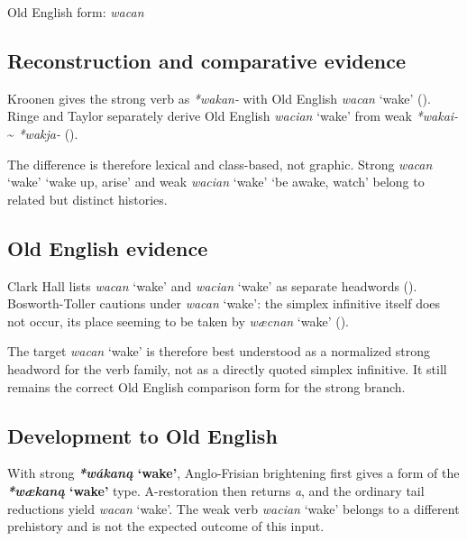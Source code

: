 \documentclass[
  british,
  a4paper,
  openany]{book}
\providecommand{\Recon}[1]{\emph{*#1}}
{\catcode`→=\active \global\def→{\ensuremath{\rightarrow}}}
\providecommand{\Recon}[1]{\emph{*#1}}
{\catcode`→=\active \global\def→{\ensuremath{\rightarrow}}}
\begin{document}
Old English form: \emph{wacan}

\subsection{Reconstruction and comparative
evidence}\label{reconstruction-and-comparative-evidence-101}

Kroonen gives the strong verb as \emph{*wakan-} with Old English
{\emph{wacan}} `wake' ().
Ringe and Taylor separately derive Old English {\emph{wacian}} `wake'
from weak \emph{*wakai-} \textasciitilde{} \emph{*wakja-}
().

The difference is therefore lexical and class-based, not graphic. Strong
{\emph{wacan}} `wake' `wake up, arise' and weak {\emph{wacian}} `wake'
`be awake, watch' belong to related but distinct histories.

\subsection{Old English evidence}\label{old-english-evidence-101}

Clark Hall lists {\emph{wacan}} `wake' and {\emph{wacian}} `wake' as
separate headwords ().
Bosworth-Toller cautions under {\emph{wacan}} `wake': the simplex
infinitive itself does not occur, its place seeming to be taken by
{\emph{wæcnan}} `wake' ().

The target {\emph{wacan}} `wake' is therefore best understood as a
normalized strong headword for the verb family, not as a directly quoted
simplex infinitive. It still remains the correct Old English comparison
form for the strong branch.

\subsection{Development to Old
English}\label{development-to-old-english-101}

With strong \textbf{{\Recon{wákaną} `wake'}}, Anglo-Frisian brightening
first gives a form of the \textbf{\Recon{wækaną} `wake'} type.
A-restoration then returns \emph{a}, and the ordinary tail reductions
yield {\emph{wacan}} `wake'. The weak verb {\emph{wacian}} `wake'
belongs to a different prehistory and is not the expected outcome of
this input.
\end{document}

